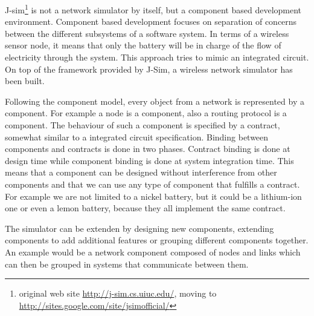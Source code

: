 \label{subsec:jsim}
J-sim\footnote {original web site \url{http://j-sim.cs.uiuc.edu/}, moving to 
\url{http://sites.google.com/site/jsimofficial/}}\cite{jsim-new} is not a network simulator
by itself, but a component based development environment. Component based
development focuses on separation of concerns between the different subsystems
of a software system. In terms of a wireless sensor node, it means that only 
the battery will be in charge of the flow of electricity through the system.
This approach tries to mimic an integrated circuit. On top of the framework 
provided by J-Sim, a wireless network simulator has been built.

Following the component model, every object from a network is represented
by a component. For example a node is a component, also a routing protocol
is a component. The behaviour of such a component is specified by a contract,
somewhat similar to a integrated circuit specification. Binding between components and contracts
is done in two phases. Contract binding is done at design time while component
binding is done at system integration time. This means that a component can be
designed without interference from other components and that we can use any type
of component that fulfills a contract. For example we are not limited to a nickel
battery, but it could be a lithium-ion one or even a lemon battery, because they all
implement the same contract.

The simulator can be extenden by designing new components, extending components to add
additional features or grouping different components together. An example would be a 
network component composed of nodes and links which can then be grouped in systems that
communicate between them.
